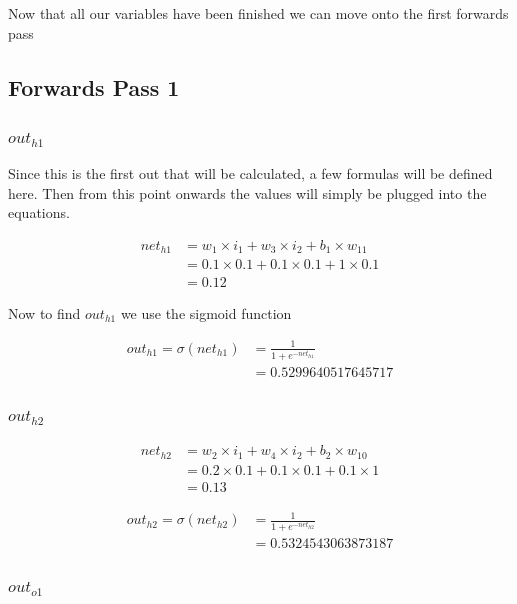\documentclass{article}
\begin{document}
Now that all our variables have been finished we can move onto the first
forwards pass

\newpage
\subsection{Forwards Pass 1}

\subsubsection{$out_{h1}$}
Since this is the first out that will be calculated, a few formulas will be
defined here. Then from this point onwards the values will simply be plugged
into the equations.

\begin{align*}
    net_{h1} & = w_{1} \times i_1 + w_{3} \times i_{2} + b_{1} \times w_{11} \\
           & = 0.1 \times 0.1 + 0.1 \times 0.1 + 1 \times 0.1 \\
           & = 0.12
\end{align*}

Now to find $out_{h1}$ we use the sigmoid function

\begin{align*}
    out_{h1} = \sigma(net_{h1}) & = \frac{1}{1 + e^{-net_{h1}}} \\
 &= 0.5299640517645717
\end{align*}

\subsubsection{$out_{h2}$}
\begin{align*}
    net_{h2} & = w_{2} \times i_1 + w_{4} \times i_{2} + b_{2} \times w_{10} \\
    & = 0.2 \times 0.1 + 0.1 \times 0.1 + 0.1 \times 1 \\
    & = 0.13
\end{align*}

\begin{align*}
    out_{h2} = \sigma(net_{h2}) & = \frac{1}{1 + e^{-net_{h2}}} \\
 &= 0.5324543063873187
\end{align*}

\subsubsection{$out_{o1}$}
\end{document}
